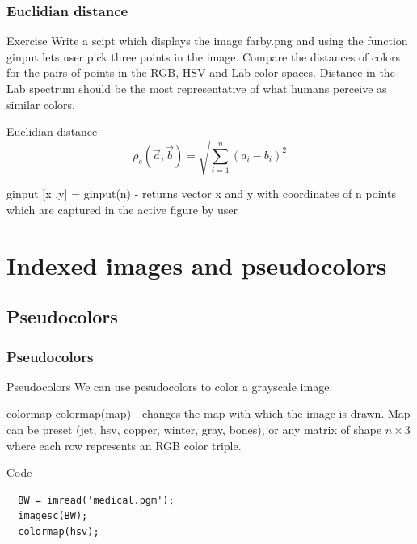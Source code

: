 \documentclass{beamer}
\begin{document}
\begin{frame}
\frametitle{Euclidian distance}
  \begin{block}{Exercise}
  Write a scipt which displays the image farby.png and using the function ginput lets user pick three points in the image. Compare the distances of colors for the pairs of points in the RGB, HSV and Lab color spaces. Distance in the Lab spectrum should be the most representative of what humans perceive as similar colors.
  \end{block} 
  
    \begin{block}{Euclidian distance}
  \begin{equation*}
  \rho_e(\vec{a}, \vec{b}) = \sqrt{\sum_{i=1}^n (a_i - b_i)^2}
  \end{equation*}
  \end{block} 

  \begin{block}{ginput}
  [x ,y] = ginput(n) - returns vector x and y with coordinates of n points which are captured in the active figure by user
  \end{block} 
\end{frame}


\section{Indexed images and pseudocolors}
\subsection{Pseudocolors}
\begin{frame}[fragile]
\frametitle{Pseudocolors}
  \begin{block}{Pseudocolors}
  We can use pesudocolors to color a grayscale image.
  \end{block} 
  
  \begin{block}{colormap}
  colormap(map) - changes the map with which the image is drawn. Map can be preset (jet, hsv, copper, winter, gray, bones), or any matrix of shape  $n \times 3$ where each row represents an RGB color triple.
  \end{block} 

  \begin{block}{Code}
  \begin{verbatim}
  BW = imread('medical.pgm');
  imagesc(BW);
  colormap(hsv);\end{verbatim}
  \end{block} 
\end{frame}
\end{document}
